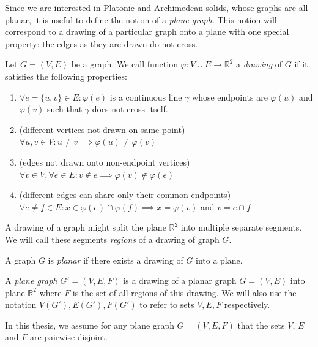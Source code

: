 \begin{highlight}
Since we are interested in Platonic and Archimedean solids, whose graphs are all planar, it is useful to define the notion of a \textit{plane graph}. This notion will correspond to a drawing of a particular graph onto a plane with one special property: the edges as they are drawn do not cross.

\begin{definition}
    Let $G=(V,E)$ be a graph. We call function $\varphi : V \cup E \rightarrow \mathbb{R}^2$ a \textit{drawing} of $G$ if it satisfies the following properties:
    \begin{enumerate}
    
        \item $\forall e=\{u,v\} \in E : \varphi(e)$ is a continuous line $\gamma$ whose endpoints are $\varphi(u)$ and $\varphi(v)$ such that $\gamma$ does not cross itself.
        
        \item (different vertices not drawn on same point) \\ $\forall u,v \in V : u \neq v \implies \varphi(u) \neq \varphi(v)$
        
        \item (edges not drawn onto non-endpoint vertices) \\ $\forall v \in V, \forall e \in E: v \notin e \implies \varphi(v) \notin \varphi(e)$
        
        \item (different edges can share only their common endpoints) \\ $\forall e \neq f \in E : x \in \varphi(e) \cap \varphi(f) \implies x = \varphi(v)$ and $v = e \cap f$
    \end{enumerate}
\end{definition}

A drawing of a graph might split the plane $\mathbb{R}^2$ into multiple separate segments. We will call these segments \textit{regions} of a drawing of graph $G$.

\begin{definition}
    A graph $G$ is \textit{planar} if there exists a drawing of $G$ into a plane.
\end{definition}

\begin{definition}
    A \textit{plane graph} $G' = (V,E,F)$ is a drawing of a planar graph $G=(V,E)$ into plane $\mathbb{R}^2$ where $F$ is the set of all regions of this drawing. We will also use the notation $V(G'), E(G'), F(G')$ to refer to sets $V,E,F$ respectively.
\end{definition}

In this thesis, we assume for any plane graph $G=(V,E,F)$ that the sets $V$, $E$ and $F$ are pairwise disjoint.

\end{highlight}


